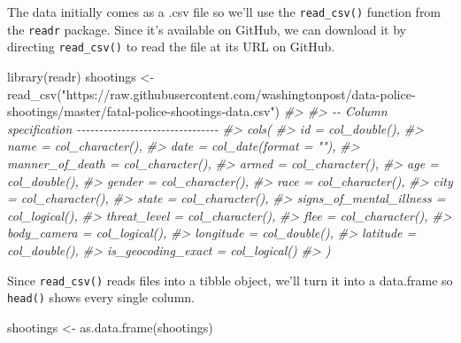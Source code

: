 \documentclass[
  12pt,
  openany]{book}
\newenvironment{Shaded}{\begin{snugshade}}{\end{snugshade}}
\newcommand{\CommentTok}[1]{\textcolor[rgb]{0.37,0.37,0.37}{\textit{#1}}}
\newcommand{\FunctionTok}[1]{\textcolor[rgb]{0,0,0}{#1}}
\newcommand{\NormalTok}[1]{#1}
\newcommand{\OtherTok}[1]{\textcolor[rgb]{0.37,0.37,0.37}{#1}}
\newcommand{\StringTok}[1]{\textcolor[rgb]{0.5,0.5,0.5}{#1}}
\begin{document}
The data initially comes as a .csv file so we'll use the \texttt{read\_csv()} function from the \texttt{readr} package. Since it's available on GitHub, we can download it by directing \texttt{read\_csv()} to read the file at its URL on GitHub.

\begin{Shaded}
\begin{Highlighting}[]
\FunctionTok{library}\NormalTok{(readr)}
\NormalTok{shootings }\OtherTok{\textless{}{-}} \FunctionTok{read\_csv}\NormalTok{(}\StringTok{"https://raw.githubusercontent.com/washingtonpost/data{-}police{-}shootings/master/fatal{-}police{-}shootings{-}data.csv"}\NormalTok{)}
\CommentTok{\#\textgreater{} }
\CommentTok{\#\textgreater{} {-}{-} Column specification {-}{-}{-}{-}{-}{-}{-}{-}{-}{-}{-}{-}{-}{-}{-}{-}{-}{-}{-}{-}{-}{-}{-}{-}{-}{-}{-}{-}{-}{-}{-}{-}}
\CommentTok{\#\textgreater{} cols(}
\CommentTok{\#\textgreater{}   id = col\_double(),}
\CommentTok{\#\textgreater{}   name = col\_character(),}
\CommentTok{\#\textgreater{}   date = col\_date(format = ""),}
\CommentTok{\#\textgreater{}   manner\_of\_death = col\_character(),}
\CommentTok{\#\textgreater{}   armed = col\_character(),}
\CommentTok{\#\textgreater{}   age = col\_double(),}
\CommentTok{\#\textgreater{}   gender = col\_character(),}
\CommentTok{\#\textgreater{}   race = col\_character(),}
\CommentTok{\#\textgreater{}   city = col\_character(),}
\CommentTok{\#\textgreater{}   state = col\_character(),}
\CommentTok{\#\textgreater{}   signs\_of\_mental\_illness = col\_logical(),}
\CommentTok{\#\textgreater{}   threat\_level = col\_character(),}
\CommentTok{\#\textgreater{}   flee = col\_character(),}
\CommentTok{\#\textgreater{}   body\_camera = col\_logical(),}
\CommentTok{\#\textgreater{}   longitude = col\_double(),}
\CommentTok{\#\textgreater{}   latitude = col\_double(),}
\CommentTok{\#\textgreater{}   is\_geocoding\_exact = col\_logical()}
\CommentTok{\#\textgreater{} )}
\end{Highlighting}
\end{Shaded}

Since \texttt{read\_csv()} reads files into a tibble object, we'll turn it into a data.frame so \texttt{head()} shows every single column.

\begin{Shaded}
\begin{Highlighting}[]
\NormalTok{shootings }\OtherTok{\textless{}{-}} \FunctionTok{as.data.frame}\NormalTok{(shootings)}
\end{Highlighting}
\end{Shaded}
\end{document}
